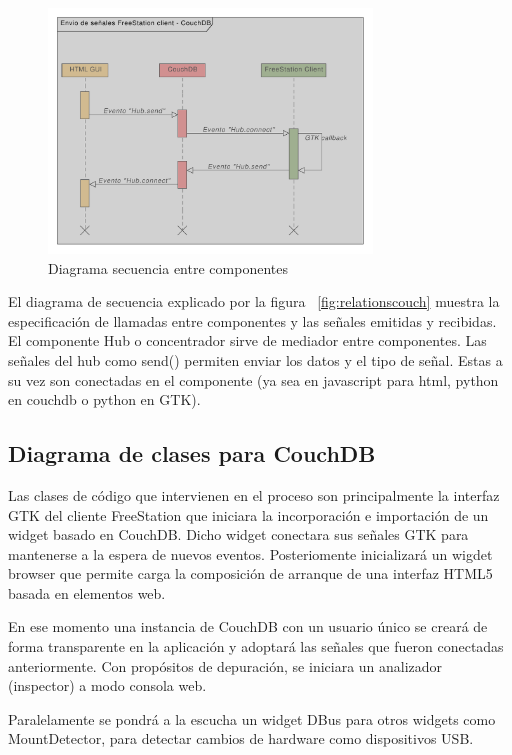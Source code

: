 \begin{figure}[hb]
    \begin{center}
        \includegraphics[width=325px]{src/img/diagrams/freestation-seq-diagram-couchdb.pdf}
        \caption[Diagrama secuencia entre componentes] {Diagrama secuencia entre componentes}
          \label{fig:secuenciacouch}
    \end{center}
\end{figure}

\newpage
El diagrama de secuencia explicado por la figura ~\ref{fig:relationscouch}
muestra la especificación de llamadas entre componentes y las señales emitidas y
recibidas. El componente Hub o concentrador sirve de mediador entre componentes.
Las señales del hub como send() permiten enviar los datos y el tipo de señal.
Estas a su vez son conectadas en el componente (ya sea en javascript para html,
python en couchdb o python en GTK).

\subsection{Diagrama de clases para CouchDB}
\label{sec:classforcouchdb}
Las clases de código que intervienen en el proceso son principalmente la
interfaz GTK del cliente FreeStation que iniciara la incorporación e importación de un
widget basado en CouchDB. Dicho widget conectara sus señales GTK para 
mantenerse a la espera de nuevos eventos. Posteriomente inicializará un
wigdet browser que permite carga la composición de arranque de una interfaz
HTML5 basada en elementos web.

En ese momento una instancia de CouchDB con un usuario único se creará de forma
transparente en la aplicación y adoptará las señales que fueron conectadas
anteriormente. Con propósitos de depuración, se iniciara un analizador 
(inspector) a modo consola web.

Paralelamente se pondrá a la escucha un widget DBus para otros widgets como
MountDetector, para detectar cambios de hardware como dispositivos USB.

